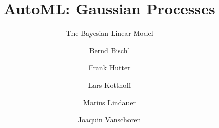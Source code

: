 




\newcommand{\lz}{\vspace{0.5cm}}
\newcommand{\thetab}{\bm{\weights}}
\newcommand{\zero}{\mathbf{0}}
\newcommand{\Xmat}{\mathbf{X}}
\newcommand{\ydat}{\mathbf{y}}
\newcommand{\id}{\boldsymbol{I}}
\newcommand{\Amat}{\mathbf{A}}
\newcommand{\Xspace}{\mathcal{X}}                                           
\newcommand{\Yspace}{\mathcal{Y}}
\newcommand{\ls}{\ell}
\newcommand{\natnum}{\mathbb{N}}
\newcommand{\intnum}{\mathbb{Z}}

\usepackage{fontawesome}
\usepackage{dirtytalk}
\usepackage{csquotes}


\title[AutoML: GPs]{AutoML: Gaussian Processes} %
\subtitle{The Bayesian Linear Model} %
\author[Marius Lindauer]{\underline{Bernd Bischl} \and Frank Hutter \and Lars Kotthoff\newline \and Marius Lindauer \and Joaquin Vanschoren}
\institute{}
\date{}





	
	\maketitle
	

